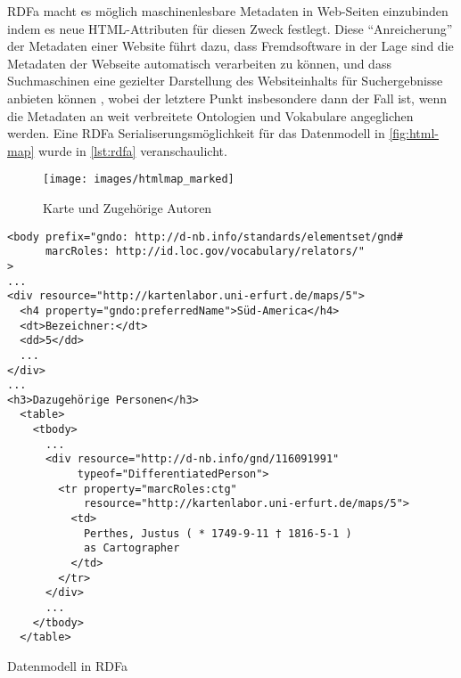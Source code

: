 RDFa macht es möglich maschinenlesbare Metadaten in Web-Seiten einzubinden indem es neue HTML-Attributen für diesen Zweck festlegt. Diese \hyphenquote{german}{Anreicherung} der Metadaten einer Website führt dazu, dass Fremdsoftware in der Lage sind die Metadaten der Webseite automatisch verarbeiten zu können, und dass Suchmaschinen eine gezielter Darstellung des Websiteinhalts für Suchergebnisse anbieten können \parencite[vgl.][Abs.~2]{Schreiber:14:RP}, wobei der letztere Punkt insbesondere dann der Fall ist, wenn die Metadaten an weit verbreitete Ontologien und Vokabulare angeglichen werden. Eine RDFa Serialiserungsmöglichkeit für das Datenmodell in \autoref{fig:html-map} wurde in \autoref{lst:rdfa} veranschaulicht.

\begin{figure}[h]
	\centering
	\texttt{[image: images/htmlmap\_marked]}
	\caption[Karte und Zugehörige Autoren]{Karte und Zugehörige Autoren}
	\label{fig:html-map}
\end{figure}

\begin{listing}[H]
\begin{verbatim}
<body prefix="gndo: http://d-nb.info/standards/elementset/gnd#
      marcRoles: http://id.loc.gov/vocabulary/relators/"
>
...
<div resource="http://kartenlabor.uni-erfurt.de/maps/5">
  <h4 property="gndo:preferredName">Süd-America</h4>	
  <dt>Bezeichner:</dt>
  <dd>5</dd>
  ...
</div>
...
<h3>Dazugehörige Personen</h3>
  <table>
    <tbody>
      ...
      <div resource="http://d-nb.info/gnd/116091991"
           typeof="DifferentiatedPerson">
        <tr property="marcRoles:ctg" 
            resource="http://kartenlabor.uni-erfurt.de/maps/5">
          <td>
            Perthes, Justus ( * 1749-9-11 † 1816-5-1 ) 
            as Cartographer
          </td>
        </tr>
      </div>
      ...
    </tbody>
  </table>
\end{verbatim}
\caption{Datenmodell in RDFa}
\label{lst:rdfa}
\end{listing}